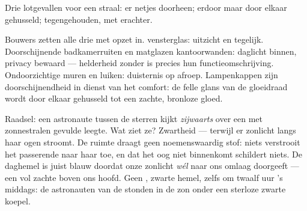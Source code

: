 \begin{omfigure}

{\small Drie lotgevallen voor een straal: er netjes doorheen; erdoor
maar door elkaar gehusseld; tegengehouden, met  erachter.}
\end{omfigure}

\begin{example}\label{ex:g7:light-sources-propagation:architecture}
Bouwers zetten alle drie met opzet in.  vensterglas:
uitzicht en  tegelijk. Doorschijnende badkamerruiten en
matglazen kantoorwanden: daglicht binnen, privacy bewaard ---
helderheid zonder  is precies hun functieomschrijving.
Ondoorzichtige muren en luiken: duisternis op afroep. Lampenkappen
zijn doorschijnendheid in dienst van het comfort: de felle glans van de
gloeidraad wordt door elkaar gehusseld tot een zachte, bronloze gloed.
\end{example}

\begin{remark}\label{rem:g7:light-sources-propagation:space}
Raadsel: een astronaute tussen de sterren kijkt \emph{zijwaarts}
over een met zonnestralen gevulde leegte. Wat ziet ze? Zwartheid ---
terwijl er zonlicht langs haar ogen stroomt. De ruimte draagt geen
noemenswaardig stof: niets verstrooit het passerende  naar
haar toe, en  dat het oog niet binnenkomt schildert niets. De
daghemel is juist blauw doordat onze  zonlicht \emph{wél} naar
ons omlaag doorgeeft --- een  vol zachte  boven
ons hoofd. Geen , zwarte hemel, zelfs om twaalf uur 's middags: de
astronauten van de  stonden in de zon onder een sterloze zwarte
koepel.
\end{remark}

